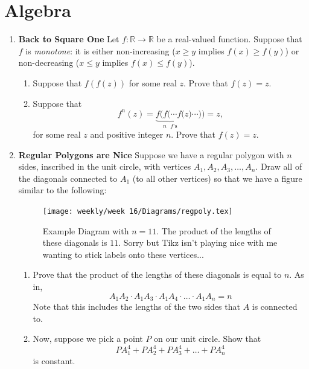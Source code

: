 \documentclass[11pt]{scrartcl}
\begin{document}
\section{Algebra}
\begin{enumerate}[label=\textbf{A\arabic*}.]
    \item \textbf{Back to Square One} \newline
    Let $f : \mathbb R \to \mathbb R$ be a real-valued function. Suppose that $f$ is \emph{monotone}: it is either non-increasing ($x \ge y$ implies $f(x) \ge f(y)$) or non-decreasing ($x \le y$ implies $f(x) \le f(y)$).
    
    \begin{enumerate}
        \item Suppose that $f(f(z))$ for some real $z$. Prove that $f(z) = z$.
        \item Suppose that
        \[ f^n(z) = \underbrace{f(f(\cdots f(}_{\text{$n$ $f$'s}}z)\cdots)) = z, \]
        for some real $z$ and positive integer $n$. Prove that $f(z) = z$.
    \end{enumerate}
    
    \newpage
    
    \item \textbf{Regular Polygons are Nice} \newline
    Suppose we have a regular polygon with $n$ sides, inscribed in the unit circle, with vertices $A_1, A_2, A_3, \dots, A_n$. Draw all of the diagonals connected to $A_1$ (to all other vertices) so that we have a figure similar to the following:
    
    \begin{figure}[h]
        \centering
        \texttt{[image: weekly/week 16/Diagrams/regpoly.tex]}
        \hspace{2em}
        \caption{Example Diagram with $n = 11$. The product of the lengths of these diagonals is $11$. Sorry but Tikz isn't playing nice with me wanting to stick labels onto these vertices...}
        \label{fig:despicable}
    \end{figure}
    
    \begin{enumerate}
        \item Prove that the product of the lengths of these diagonals is equal to $n$. As in,
        \[ A_1A_2 \cdot A_1A_3 \cdot A_1A_4 \cdot \dots \cdot A_1A_n = n \]
        Note that this includes the lengths of the two sides that $A$ is connected to.
        
        \item Now, suppose we pick a point $P$ on our unit circle. Show that
        \[ PA_1^4 + PA_2^4 + PA_3^4 + \dots + PA_n^4 \]
        is constant.
        

\end{enumerate}
\end{enumerate}
\end{document}
